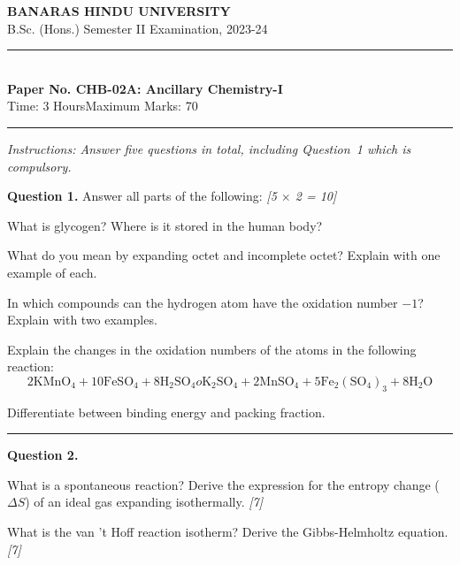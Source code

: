 \documentclass[11pt,a4paper]{article}
\newcommand{\pts}[1]{\hfill   \textit{[#1]}}
\begin{document}
\begin{center}
  {\large\bfseries BANARAS HINDU UNIVERSITY}\\[2pt]
  {\normalsize B.Sc. (Hons.) Semester II Examination, 2023-24}\\[6pt]
  \rule{0.8\linewidth}{0.5pt}\\[6pt]
  {\large\bfseries Paper No. CHB-02A: Ancillary Chemistry-I}\\[4pt]
  {\normalsize Time: 3 Hours\hfill Maximum Marks: 70}
\end{center}
\rule{\linewidth}{0.4pt}
\small



\noindent   \textit{Instructions: Answer five questions in total, including Question~1 which is compulsory.}

\normalsize
\bigskip




\noindent   \textbf{Question 1.} Answer all parts of the following: \pts{5 $ \times$ 2 = 10}

\begin{parts}
  \item What is glycogen? Where is it stored in the human body?
  \item What do you mean by expanding octet and incomplete octet? Explain with one example of each.
  \item In which compounds can the hydrogen atom have the oxidation number $-1$? Explain with two examples.
  \item Explain the changes in the oxidation numbers of the atoms in the following reaction:
    \[ 2 \text{KMnO}_4 + 10 \text{FeSO}_4 + 8 \text{H}_2 \text{SO}_4  o  \text{K}_2 \text{SO}_4 + 2 \text{MnSO}_4 + 5 \text{Fe}_2( \text{SO}_4)_3 + 8 \text{H}_2 \text{O} \]
  \item Differentiate between binding energy and packing fraction.
\end{parts}

\medskip\rule{\linewidth}{0.2pt}




\noindent   \textbf{Question 2.}

\begin{parts}
  \item What is a spontaneous reaction? Derive the expression for the entropy change ($\Delta S$) of an ideal gas expanding isothermally. \pts{7}
  \item What is the van 't Hoff reaction isotherm? Derive the Gibbs-Helmholtz equation. \pts{7}
\end{parts}
\end{document}
